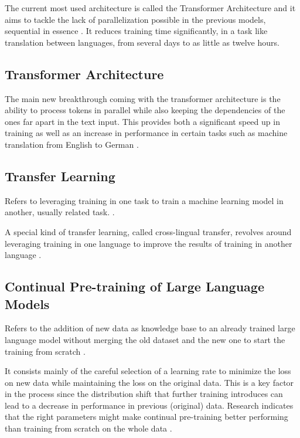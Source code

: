 The current most used architecture is called the Transformer Architecture and it aims to tackle the lack of parallelization possible in the previous models, sequential in essence \cite{vaswani2017attention}. It reduces training time significantly, in a task like translation between languages, from several days \cite{bahdanau2014neural} to as little as twelve hours.


\subsection{Transformer Architecture}


The main new breakthrough coming with the transformer architecture is the ability to process tokens in parallel while also keeping the dependencies of the ones far apart in the text input. This provides both a significant speed up in training as well as an increase in performance in certain tasks such as machine translation from English to German \cite{vaswani2017attention}.

\subsection{Transfer Learning}

Refers to leveraging training in one task to train a machine learning model in another, usually related task. \cite{torrey2010transfer}. 

A special kind of transfer learning, called cross-lingual transfer, revolves around leveraging training in one language to improve the results of training in another language \cite{cross_lingual_transfer}.

\subsection{Continual Pre-training of Large Language Models}
Refers to the addition of new data as knowledge base to an already trained large language model without merging the old dataset and the new one to start the training from scratch \cite{gupta2023continual}.

It consists mainly of the careful selection of a learning rate to minimize the loss on new data while maintaining the loss on the original data. This is a key factor in the process since the distribution shift that further training introduces can lead to a decrease in performance in previous (original) data. Research indicates that the right parameters might make continual pre-training better performing than training from scratch on the whole data \cite{gupta2023continual}.


